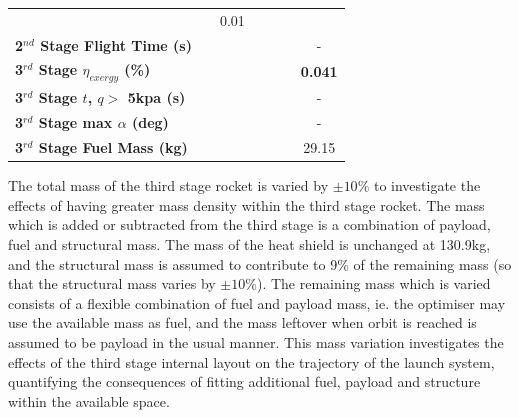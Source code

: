 \begin{table}[ht]
\begin{tabular}{l c c c c c c}
		& \secondthirdSeparationLDmThreeOneHundredTenNoReturn
		&0.01
		\\
		\textbf{2$^{nd}$ Stage Flight Time (s)}
		& \secondFlightTimemThreeNinetyNoReturn
		& \secondFlightTimemThreeNinetyFiveNoReturn
		& \secondFlightTimemThreeStandardNoReturn
		& \secondFlightTimemThreeOneHundredFiveNoReturn
		& \secondFlightTimemThreeOneHundredTenNoReturn
		& -
		\\
		\hline 
		\textbf{3$^{rd}$ Stage $\eta_{exergy}$ (\%)}
		& \textbf{\thirddExergyEffmThreeNinetyNoReturn}
		& \textbf{\thirddExergyEffmThreeNinetyFiveNoReturn}
		& \textbf{\thirddExergyEffmThreeStandardNoReturn}
		& \textbf{\thirddExergyEffmThreeOneHundredFiveNoReturn}
		& \textbf{\thirddExergyEffmThreeOneHundredTenNoReturn}
		& \textbf{0.041}
		\\
		\textbf{3$^{rd}$ Stage $t$, $q >$ 5kpa (s)}
		& \thirdqOverFivemThreeNinetyNoReturn
		& \thirdqOverFivemThreeNinetyFiveNoReturn
		& \thirdqOverFivemThreeStandardNoReturn
		& \thirdqOverFivemThreeOneHundredFiveNoReturn
		& \thirdqOverFivemThreeOneHundredTenNoReturn
		& -
		\\
		\textbf{3$^{rd}$ Stage max $\alpha$ (deg)}
		& \thirdmaxAoAmThreeNinetyNoReturn
		& \thirdmaxAoAmThreeNinetyFiveNoReturn
		& \thirdmaxAoAmThreeStandardNoReturn
		& \thirdmaxAoAmThreeOneHundredFiveNoReturn
		& \thirdmaxAoAmThreeOneHundredTenNoReturn
		& -
		\\
		\textbf{3$^{rd}$ Stage Fuel Mass (kg)}
		& \thirdmFuelmThreeNinetyNoReturn
		& \thirdmFuelmThreeNinetyFiveNoReturn
		& \thirdmFuelmThreeStandardNoReturn
		& \thirdmFuelmThreeOneHundredFiveNoReturn
		& \thirdmFuelmThreeOneHundredTenNoReturn
		&29.15
		\\
		\hline 
	\end{tabular} 
	
\end{table}


The total mass of the third stage rocket is varied by $\pm10\%$ to investigate the effects of having greater mass density within the third stage rocket. The mass which is added or subtracted from the third stage is a combination of payload, fuel and structural mass. 
The mass of the heat shield is unchanged at 130.9kg, and the structural mass is assumed to contribute to 9\% of the remaining mass (so that the structural mass varies by $\pm10\%$). The remaining mass which is varied consists of a flexible combination of fuel and payload mass, ie. the optimiser may use the available mass as fuel, and the mass leftover when orbit is reached is assumed to be payload in the usual manner. 
This mass variation investigates the effects of the third stage internal layout on the trajectory of the launch system, quantifying the consequences of fitting additional fuel, payload and structure within the available space.

